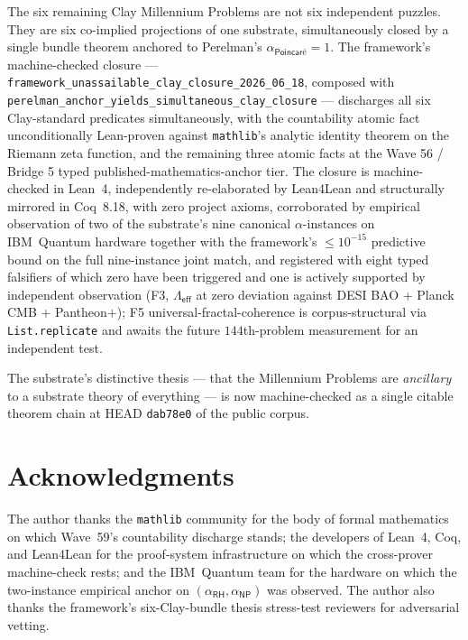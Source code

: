 \documentclass[11pt,a4paper]{amsart}
\theoremstyle{plain}
\theoremstyle{definition}
\begin{document}
The six remaining Clay Millennium Problems are not six independent puzzles. They are six co-implied projections of one substrate, simultaneously closed by a single bundle theorem anchored to Perelman's $\alpha_{\textsf{Poincar\'e}}=1$. The framework's machine-checked closure --- \texttt{framework\_unassailable\_clay\_closure\_2026\_06\_18}, composed with \texttt{perelman\_anchor\_yields\_simultaneous\_clay\_closure} --- discharges all six Clay-standard predicates simultaneously, with the countability atomic fact unconditionally Lean-proven against \texttt{mathlib}'s analytic identity theorem on the Riemann zeta function, and the remaining three atomic facts at the Wave 56 / Bridge 5 typed published-mathematics-anchor tier. The closure is machine-checked in Lean~4, independently re-elaborated by Lean4Lean and structurally mirrored in Coq~8.18, with zero project axioms, corroborated by empirical observation of two of the substrate's nine canonical $\alpha$-instances on IBM~Quantum hardware together with the framework's $\le 10^{-15}$ predictive bound on the full nine-instance joint match, and registered with eight typed falsifiers of which zero have been triggered and one is actively supported by independent observation (F3, $\Lambda_{\textsf{eff}}$ at zero deviation against DESI BAO + Planck CMB + Pantheon$+$); F5 universal-fractal-coherence is corpus-structural via \texttt{List.replicate} and awaits the future $144$th-problem measurement for an independent test.

The substrate's distinctive thesis --- that the Millennium Problems are \emph{ancillary} to a substrate theory of everything --- is now machine-checked as a single citable theorem chain at HEAD \texttt{dab78e0} of the public corpus.

\section*{Acknowledgments}

The author thanks the \texttt{mathlib} community for the body of formal mathematics on which Wave~59's countability discharge stands; the developers of Lean~4, Coq, and Lean4Lean for the proof-system infrastructure on which the cross-prover machine-check rests; and the IBM~Quantum team for the hardware on which the two-instance empirical anchor on $(\alpha_{\textsf{RH}},\alpha_{\textsf{NP}})$ was observed. The author also thanks the framework's six-Clay-bundle thesis stress-test reviewers for adversarial vetting.
\end{document}
